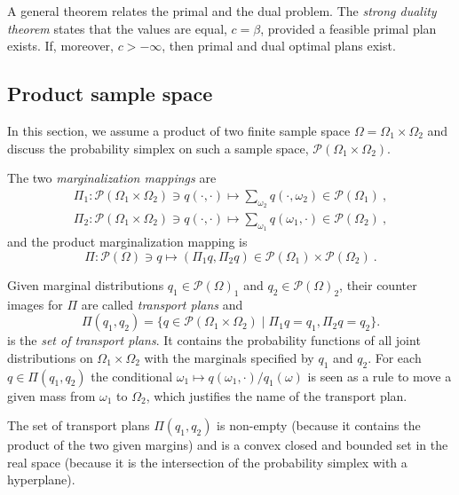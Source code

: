 \documentclass[axioms,article,submit,pdftex,moreauthors]{Definitions/mdpi}
\theoremstyle{plain}
\theoremstyle{remark}
\newcommand{\densitieson}[1]{\mathcal P\left(#1\right)}
\begin{document}
A general theorem relates the primal and the dual problem. The \emph{strong duality theorem} states that the values are equal, \( c = \beta \), provided a feasible primal plan exists. If, moreover, \( c > -\infty \), then primal and dual optimal plans exist.

\subsection{Product sample space}

In this section, we assume a product of two finite sample space \( \Omega = \Omega_1 \times \Omega_2 \) and discuss the probability simplex on such a sample space, \( \densitieson{\Omega_1 \times \Omega_2} \). 

The two \emph{marginalization mappings} are
\begin{gather*} 
\Pi_1 : \mathcal{P} (\Omega_1 \times \Omega_2) \ni q(\cdot, \cdot) \mapsto \sum_{\omega_2} q(\cdot, \omega_2) \in \mathcal{P} (\Omega_1) \ , \\
\Pi_2 : \mathcal{P} (\Omega_1 \times \Omega_2) \ni q(\cdot, \cdot) \mapsto \sum_{\omega_1} q(\omega_1, \cdot) \in \mathcal{P} (\Omega_2) \ ,
\end{gather*} 
and the product marginalization mapping is
\begin{equation*}
    \Pi \colon \densitieson\Omega \ni q \mapsto (\Pi_1 q,\Pi_2 q) \in \densitieson{\Omega_1} \times \densitieson {\Omega_2}  \ .
\end{equation*}

Given marginal distributions \( q_1 \in \densitieson \Omega_1 \) and \( q_2 \in \densitieson\Omega_2 \), their counter images for $\Pi$ are called \emph{transport plans} and 
     \begin{equation} \label{eq:transport-plans}
     \Pi(q_1, q_2) = \{q \in \mathcal{P} (\Omega_1 \times \Omega_2) \mid \Pi_1 q = q_1, \Pi_2 q = q_2\}.
     \end{equation} 
is the \emph{set of transport plans}. It contains the probability functions of all joint distributions on \( \Omega_1 \times \Omega_2 \) with the marginals specified by \( q_1 \) and \( q_2 \). For each $q \in \Pi(q_1,q_2)$ the conditional $\omega_1 \mapsto q(\omega_1,\cdot) / q_1(\omega)$ is seen as a rule to move a given mass from $\omega_1$ to $\Omega_2$, which justifies the name of the transport plan.

The set of transport plans \( \Pi(q_1, q_2) \) is non-empty (because it contains the product of the two given margins) and is a convex closed and bounded set in the real space (because it is the intersection of the probability simplex with a hyperplane).
\end{document}
